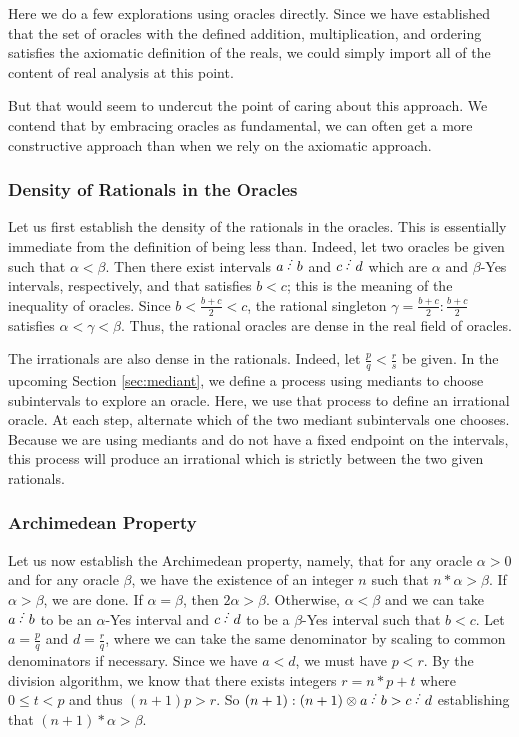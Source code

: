 \documentclass[12pt]{article}
\begin{document}
Here we do a few explorations using oracles directly. Since we have established that the set of oracles with the defined addition, multiplication, and ordering satisfies the axiomatic definition of the reals, we could simply import all of the content of real analysis at this point. 

But that would seem to undercut the point of caring about this approach. We contend that by embracing oracles as fundamental, we can often get a more constructive approach than when we rely on the axiomatic approach. 

\subsubsection{Density of Rationals in the Oracles}

Let us first establish the density of the rationals in the oracles. This is essentially immediate from the definition of being less than. Indeed, let two oracles be given such that $\alpha < \beta$. Then there exist intervals $a\lte b$ and $c\lte d$ which are $\alpha$ and $\beta$-Yes intervals, respectively, and that satisfies $b < c$; this is the meaning of the inequality of oracles. Since $b < \frac{b+c}{2} < c$, the rational singleton $\gamma = \frac{b+c}{2}:\frac{b+c}{2}$ satisfies $\alpha < \gamma < \beta$. Thus, the rational oracles are dense in the real field of oracles. 

The irrationals are also dense in the rationals. Indeed, let $\frac{p}{q} <\frac{r}{s}$ be given. In the upcoming Section \ref{sec:mediant}, we define a process using mediants to choose subintervals to explore an oracle. Here, we use that process to define an irrational oracle. At each step, alternate which of the two mediant subintervals one chooses. Because we are using mediants and do not have a fixed endpoint on the intervals, this process will produce an irrational which is strictly between the two given rationals. 

\subsubsection{Archimedean Property}

Let us now establish the Archimedean property, namely, that for any oracle $\alpha > 0$ and for any oracle $\beta$, we have the existence of an integer $n$ such that $n * \alpha > \beta $. If $\alpha > \beta$, we are done. If $\alpha = \beta$, then $2 \alpha > \beta$. Otherwise, $\alpha < \beta$ and we can take $a\lte b$ to be an $\alpha$-Yes interval and $c \lte d$ to be a $\beta$-Yes interval such that $b < c$. Let $a = \frac{p}{q}$ and $d = \frac{r}{q}$, where we can take the same denominator by scaling to common denominators if necessary. Since we have $a<d$, we must have $p < r$. By the division algorithm, we know that there exists integers $r = n*p + t$ where $0 \leq  t<p$ and thus $(n+1)p > r$. So $(n+1):(n+1) \otimes a\lte b > c\lte d$ establishing that $(n+1)*\alpha > \beta$.
\end{document}

